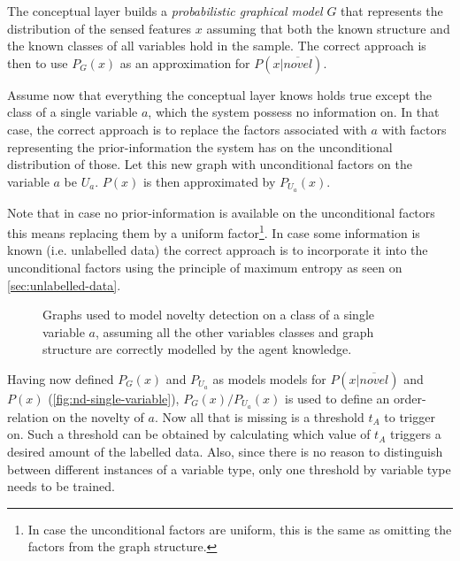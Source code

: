 The conceptual layer builds a \emph{probabilistic graphical model} $G$ that
represents the distribution of the sensed features $x$ assuming that both the
known structure and the known classes of all variables hold in the sample.
The correct approach is then to use $P_G(x)$ as an approximation for
$P(x|\overline{novel})$.

Assume now that everything the conceptual layer knows holds true except the
class of a single variable $a$, which the system possess no information on. 
In that case, the correct approach is to replace the factors associated with
$a$ with factors representing the prior-information the system has on
the unconditional distribution of those.
Let this new graph with unconditional factors on the variable
$a$ be $U_a$. $P(x)$ is then approximated by $P_{U_a}(x)$.

Note that in case no prior-information is available on the unconditional
factors this means replacing them by a uniform factor\footnote{In case the
unconditional factors are uniform, this is the same as omitting the factors
from the graph structure.}. In case some information is known
(i.e. unlabelled data) the correct approach is to incorporate it into the
unconditional factors using the principle of maximum entropy as seen on
\autoref{sec:unlabelled-data}.

\begin{figure}[h]
\centering
{}
\qquad\qquad
{}

\caption{\label{fig:nd-single-variable}Graphs used to model novelty detection on
         a class of a single variable $a$, assuming all the other variables
         classes and graph structure are correctly modelled by the agent
         knowledge.}
\end{figure}

Having now defined $P_G(x)$ and $P_{U_a}$ as models models for
$P(x|\overline{novel})$ and $P(x)$ (\autoref{fig:nd-single-variable}),
$P_G(x)/P_{U_a}(x)$ is used to define an order-relation on the novelty of $a$.
Now all that is missing is a threshold $t_A$ to trigger on.
Such a threshold can be obtained by calculating which value of $t_A$
triggers a desired amount of the labelled data.
Also, since there is no reason to distinguish between different instances of
a variable type, only one threshold by variable type needs to be trained.

